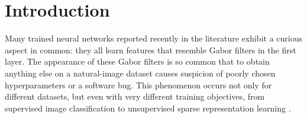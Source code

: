
\section{Introduction}

Many trained neural networks reported recently in the literature exhibit a curious aspect in common: they all learn features that resemble Gabor filters in the first layer.
The appearance of these Gabor filters is so common that to obtain anything else on a natural-image dataset causes suspicion of poorly chosen hyperparameters or a software bug. 
This phenomenon occurs not only for different datasets, but even with very different training objectives, from supervised image classification \citep{Krizhevsky-2012} to unsupervised sparse representation learning \citep{Le-2011-ICA}.


%
%
%
%
%
%
%
%
%


